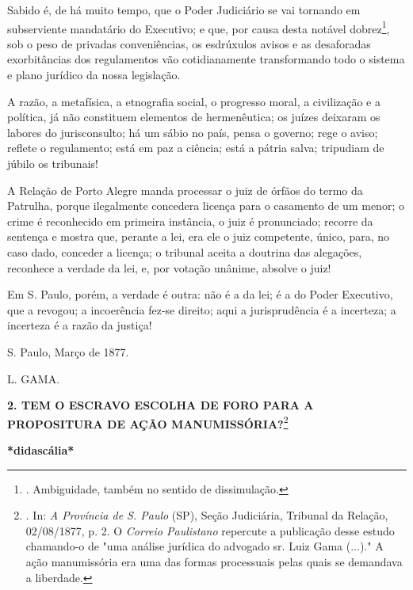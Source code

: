 Sabido é, de há muito tempo, que o Poder Judiciário se vai tornando em
subserviente mandatário do Executivo; e que, por causa desta notável
dobrez\footnote{. Ambiguidade, também no sentido de dissimulação.},
so\protect\hypertarget{Secao_Sem_Titulo-3}{}{}b o peso de privadas
conveniências, os esdrúxulos avisos e as desaforadas exorbitâncias dos
regulamentos vão cotidianamente transformando todo o sistema e plano
jurídico da nossa legislação.

A razão, a metafísica, a etnografia social, o progresso moral, a
civilização e a política, já não constituem elementos de hermenêutica;
os juízes deixaram os labores do jurisconsulto; há um sábio no país,
pensa o governo; rege o aviso; reflete o regulamento; está em paz a
ciência; está a pátria salva; tripudiam de júbilo os tribunais!

A Relação de Porto Alegre manda processar o juiz de órfãos do termo da
Patrulha, porque ilegalmente concedera licença para o casamento de um
menor; o crime é reconhecido em primeira instância, o juiz é
pronunciado; recorre da sentença e mostra que, perante a lei, era ele o
juiz competente, único, para, no caso dado, conceder a licença; o
tribunal aceita a doutrina das alegações, reconhece a verdade da lei, e,
por votação unânime, absolve o juiz!

Em S. Paulo, porém, a verdade é outra: não é a da lei; é a do Poder
Executivo, que a revogou; a incoerência fez-se direito; aqui a
jurisprudência é a incerteza; a incerteza é a razão da justiça!

S. Paulo, Março de 1877.

L. GAMA.

\textbf{2. TEM O ESCRAVO ESCOLHA DE FORO PARA A PROPOSITURA DE AÇÃO
MANUMISSÓRIA?}\footnote{. In: \emph{A Província de S. Paulo} (SP), Seção
  Judiciária, Tribunal da Relação, 02/08/1877, p. 2. O \emph{Correio
  Paulistano} repercute a publicação desse estudo chamando-o de "uma
  análise jurídica do advogado sr. Luiz Gama (...)." A ação manumissória
  era uma das formas processuais pelas quais se demandava a liberdade.}

\textbf{*didascália*}

